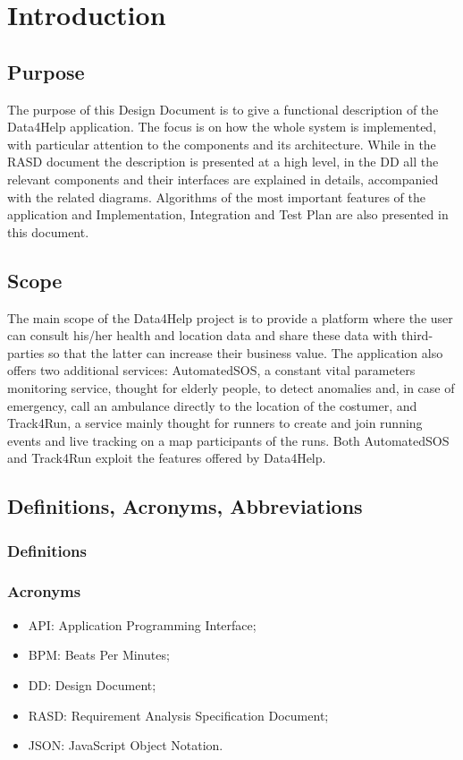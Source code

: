 \documentclass[DD.tex]{subfiles}
\begin{document}
\section{Introduction}

\subsection{Purpose}
The purpose of this Design Document is to give a functional description of the Data4Help application. The focus is on how the whole system is implemented, with particular attention to the components and its architecture. \newline
While in the RASD document the description is presented at a high level, in the DD all the relevant components and their interfaces are explained in details, accompanied with the related diagrams.
Algorithms of the most important features of the application and Implementation, Integration and Test Plan are also presented in this document. 

\subsection{Scope}
The main scope of the Data4Help project is to provide a platform where the user can consult his/her health and location data and share these data with third-parties so that the latter can increase their business value. \newline
The application also offers two additional services: AutomatedSOS, a constant vital parameters monitoring service, thought for elderly people, to detect anomalies and, in case of emergency, call an ambulance directly to the location of the costumer, and Track4Run, a service mainly thought for runners to create and join running events and live tracking on a map participants of the runs. \newline
Both AutomatedSOS and Track4Run exploit the features offered by Data4Help.

\subsection{Definitions, Acronyms, Abbreviations}

\subsubsection{Definitions}

\subsubsection{Acronyms}
\begin{itemize}
	\item API: Application Programming Interface;
	\item BPM: Beats Per Minutes;
	\item DD: Design Document;
	\item RASD: Requirement Analysis Specification Document;
	\item JSON: JavaScript Object Notation.
\end{itemize}
\end{document}
